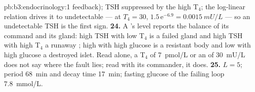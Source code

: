 \begin{solution}{pb:b3:endocrinology:1}
feedback); TSH suppressed by the high T$_{4}$; the log-linear relation
drives it to undetectable --- at $T_{4} = 30$, $1.5\,\mathrm{e}^{-6.9}
= \qty{0.0015}{mU/L}$ --- so an undetectable TSH is the first sign.
\textbf{24.} A 's level reports the balance of its command and
its gland: high TSH with low T$_{4}$ is a failed gland and high TSH with
high T$_{4}$ a runaway ; high  with high glucose is a
resistant body and low  with high glucose a destroyed islet.
Read alone, a T$_{4}$ of \qty{7}{pmol/L} or an  of
\qty{30}{mU/L} does not say where the fault lies; read with its
commander, it does.
\textbf{25.}  $L = 5$; period \qty{68}{min} and decay time
\qty{17}{min}; fasting glucose of the failing loop \qty{7.8}{mmol/L}.
\end{solution}
